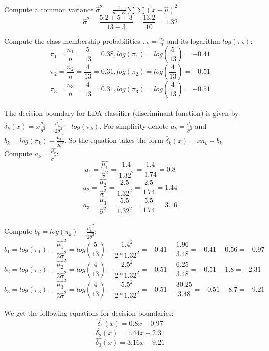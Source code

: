 \documentclass[a4paper,12pt,titlepage]{article} %
\begin{document}
Compute a common variance $ \hat{\sigma}^{2} = \frac{1}{n-K} \sum \sum{(x - \hat{\mu})^{2}} $
$$ \hat{\sigma}^{2} = \frac {5.2+5+3}{13-3} = \frac{13.2}{10} = 1.32 $$

Compute the class membership probabilities $ \pi_{k} = \frac{n_{k} }{n}$ and its logarithm $ log(\pi_{k})$:
$$ \pi_{1} = \frac{n_{1} }{n} = \frac{5}{13} = 0.38, log(\pi_{1}) = log(\frac{5}{13}) = -0.41 $$
$$ \pi_{2} = \frac{n_{2} }{n} = \frac{4}{13} = 0.31, log(\pi_{2}) = log(\frac{4}{13}) = -0.51 $$
$$ \pi_{3} = \frac{n_{3} }{n} = \frac{4}{13} = 0.31, log(\pi_{3}) = log(\frac{4}{13}) = -0.51 $$\\

The decision boundary for LDA classifier (discriminant function) is given by $ \hat{\delta}_{k}(x) = x \frac{\hat{\mu_{k}} }{\hat{\sigma}^{2}} - \frac{\hat{\mu_{k}}^{2} }{2\hat{\sigma}^{2} } + log(\pi_{k})$. 
For simplicity denote $ a_{k} = \frac{\hat{\mu_{k}} }{\hat{\sigma}^{2}} $ and $ b_{k} = log(\pi_{k}) - \frac{\hat{\mu_{k}}^{2} }{2\hat{\sigma}^{2} }$. 
So the equation takes the form $ \hat{\delta}_{k}(x) = x a_{k} + b_{k}$\\

Compute $ a_{k} = \frac{\hat{\mu_{k}} }{\hat{\sigma}^{2}} $:
$$ a_{1} = \frac{\hat{\mu_{1}} }{\hat{\sigma}^{2}} = \frac{1.4}{1.32^{2}} = \frac{1.4}{1.74} = 0.8 $$
$$ a_{2} = \frac{\hat{\mu_{2}} }{\hat{\sigma}^{2}} = \frac{2.5}{1.32^{2}} = \frac{2.5}{1.74} = 1.44 $$
$$ a_{3} = \frac{\hat{\mu_{3}} }{\hat{\sigma}^{2}} = \frac{5.5}{1.32^{2}} = \frac{5.5}{1.74} = 3.16 $$\\

Compute $ b_{k} = log(\pi_{k}) - \frac{\hat{\mu_{k}}^{2} }{2\hat{\sigma}^{2} }$:
$$ b_{1} = log(\pi_{1}) - \frac{\hat{\mu_{1}}^{2} }{2\hat{\sigma}^{2} } = log(\frac{5}{13}) - \frac{1.4^{2}}{2*1.32^{2}} = -0.41 - \frac{1.96}{3.48} = -0.41 - 0.56 = -0.97 $$
$$ b_{2} = log(\pi_{2}) - \frac{\hat{\mu_{2}}^{2} }{2\hat{\sigma}^{2} } = log(\frac{4}{13}) - \frac{2.5^{2}}{2*1.32^{2}} = -0.51 - \frac{6.25}{3.48} = -0.51 - 1.8 = -2.31 $$
$$ b_{3} = log(\pi_{3}) - \frac{\hat{\mu_{3}}^{2} }{2\hat{\sigma}^{2} } = log(\frac{4}{13}) - \frac{5.5^{2}}{2*1.32^{2}} = -0.51 - \frac{30.25}{3.48} = -0.51 - 8.7 = -9.21 $$\\

We get the following equations for decision boundaries:
$$ \hat{\delta_{1}}(x) = 0.8 x - 0.97 $$
$$ \hat{\delta_{2}}(x) = 1.44 x - 2.31 $$
$$ \hat{\delta_{3}}(x) = 3.16 x - 9.21 $$\\
\end{document}
